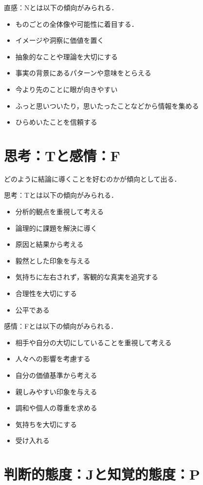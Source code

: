 直感：Nとは以下の傾向がみられる．
\begin{itemize}
\item ものごとの全体像や可能性に着目する．
\item イメージや洞察に価値を置く
\item 抽象的なことや理論を大切にする
\item 事実の背景にあるパターンや意味をとらえる
\item 今より先のことに眼が向きやすい
\item ふっと思いついたり，思いたったことなどから情報を集める
\item ひらめいたことを信頼する
\end{itemize}
\newpage
\section{思考：Tと感情：F}

どのように結論に導くことを好むのかが傾向として出る．

思考：Tとは以下の傾向がみられる．
\begin{itemize}
\item 分析的観点を重視して考える
\item 論理的に課題を解決に導く
\item 原因と結果から考える
\item 毅然とした印象を与える
\item 気持ちに左右されず，客観的な真実を追究する
\item 合理性を大切にする
\item 公平である
\end{itemize}

感情：Fとは以下の傾向がみられる．
\begin{itemize}
\item 相手や自分の大切にしていることを重視して考える
\item 人々への影響を考慮する
\item 自分の価値基準から考える
\item 親しみやすい印象を与える
\item 調和や個人の尊重を求める
\item 気持ちを大切にする
\item 受け入れる
\end{itemize}

\newpage
\section{判断的態度：Jと知覚的態度：P}

